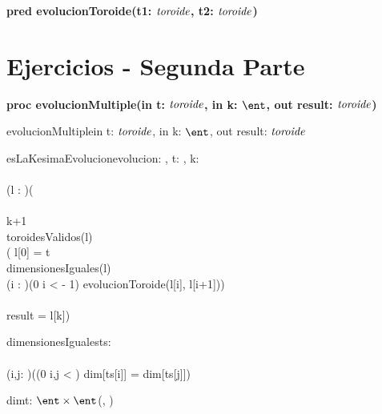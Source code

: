 \documentclass[spanish, a4paper]{article}
\begin{document}
\begin{ejercicio}[:]
\textbf{pred evolucionToroide(t1: $\textit{toroide}$, t2: $\textit{toroide}$)}

\end{ejercicio}





\section{Ejercicios - Segunda Parte}


\begin{ejercicio}[:] \textbf{proc evolucionMultiple(in t: $\textit{toroide}$, in k: $\ent$, out result: $\textit{toroide}$)}\\

\begin{proc}{evolucionMultiple}{in t: $\textit{toroide}$, in k: $\ent$, out result: $\textit{toroide}$}{}

\end{proc}

\begin{pred}{esLaKesimaEvolucion}{evolucion: \toroide, t: \toroide, k: \ent}{\\
    \\
    (\exists l : \TLista{\toroide})(\\ \\
     \geq k+1 \land \\
    toroidesValidos(l) \yLuego \\(
    l[0] = t \land \\
    dimensionesIguales(l) \land\\
    (\forall i : \ent)(0 \leq i <  - 1) \implicaLuego evolucionToroide(l[i], l[i+1])) \\ \yLuego \\
    result = l[k]) \\
}

\end{pred}

\begin{pred}{dimensionesIguales}{ts: \TLista{\toroide}}{\\
     \\
    (\forall i,j: \ent)((0 \leq i,j < ) \implicaLuego dim[ts[i]] = dim[ts[j]]) \\
}
    
\end{pred}
\begin{aux}{dim}{t: \toroide}{$\ent \times \ent$}{(, )}
\end{aux}

\end{ejercicio}
\end{document}
